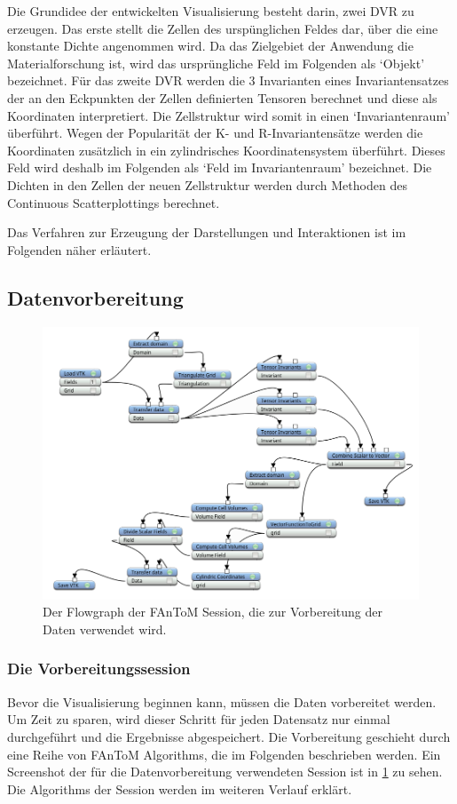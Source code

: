 \documentclass[a4paper,fontsize=12pt,toc=bib,halfparskip,ngerman]{scrartcl}
\begin{document}
Die Grundidee der entwickelten Visualisierung besteht darin, zwei DVR zu erzeugen. Das erste stellt die Zellen des ursp\"unglichen Feldes dar, \"uber die eine konstante Dichte angenommen wird. Da das Zielgebiet der Anwendung die Materialforschung ist, wird das urspr\"ungliche Feld im Folgenden als `Objekt' bezeichnet. F\"ur das zweite DVR werden die 3 Invarianten eines Invariantensatzes der an den Eckpunkten der Zellen definierten Tensoren berechnet und diese als Koordinaten interpretiert. Die Zellstruktur wird somit in einen `Invariantenraum' \"uberf\"uhrt. Wegen der Popularit\"at der K- und R-Invariantens\"atze werden die Koordinaten zus\"atzlich in ein zylindrisches Koordinatensystem \"uberf\"uhrt. Dieses Feld wird deshalb im Folgenden als `Feld im Invariantenraum' bezeichnet. Die Dichten in den Zellen der neuen Zellstruktur werden durch Methoden des Continuous Scatterplottings berechnet.

Das Verfahren zur Erzeugung der Darstellungen und Interaktionen ist im Folgenden n\"aher erl\"autert.

\subsection{Datenvorbereitung}
\begin{figure}
	\centering
	\includegraphics[width=\textwidth]{pictures/BigSession.png}
	\caption{Der Flowgraph der FAnToM Session, die zur Vorbereitung der Daten verwendet wird.}
	\label{BigSession}
\end{figure}
\subsubsection{Die Vorbereitungssession}
Bevor die Visualisierung beginnen kann, m\"ussen die Daten vorbereitet werden. Um Zeit zu sparen, wird dieser Schritt f\"ur jeden Datensatz nur einmal durchgef\"uhrt und die Ergebnisse abgespeichert. Die Vorbereitung geschieht durch eine Reihe von FAnToM Algorithms, die im Folgenden beschrieben werden. Ein Screenshot der f\"ur die Datenvorbereitung verwendeten Session ist in \cref{BigSession} zu sehen. Die Algorithms der Session werden im weiteren Verlauf erkl\"art.
\end{document}
